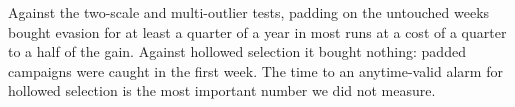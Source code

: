 Against the two-scale and multi-outlier tests, padding on the untouched weeks bought evasion for at least a quarter of a year in most runs at a cost of a quarter to a half of the gain. Against hollowed selection it bought nothing: padded campaigns were caught in the first week. The time to an anytime-valid alarm for hollowed selection is the most important number we did not measure.
